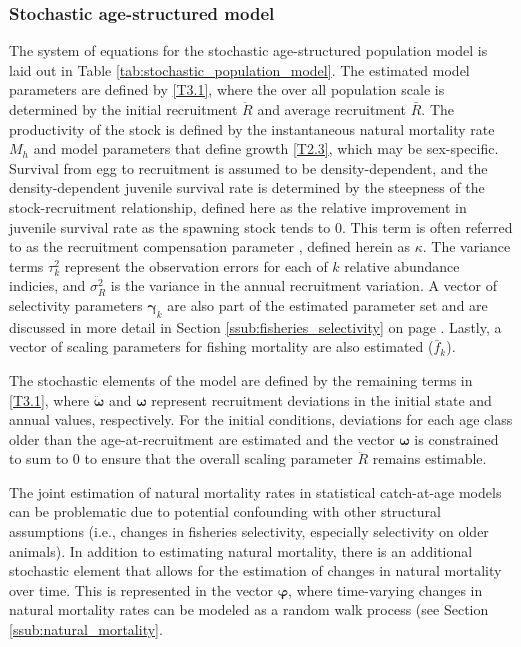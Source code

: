 \subsubsection{Stochastic age-structured model} %
\label{ssub:stochastic_age_structured_model}
    The system of equations for the stochastic age-structured population model is laid out in Table \ref{tab:stochastic_population_model}.  The estimated model parameters are defined by \eqref{T3.1}, where the over all population scale is determined by the initial recruitment $\ddot{R}$ and average recruitment $\bar{R}$.  The productivity of the stock is defined by the instantaneous natural mortality rate $M_h$ and model parameters that define growth \eqref{T2.3}, which may be sex-specific.  Survival from egg to recruitment is assumed to be density-dependent, and the density-dependent juvenile survival rate is determined by the steepness of the stock-recruitment relationship, defined here as the relative improvement in juvenile survival rate as the spawning stock tends to 0. This term is often referred to as the recruitment compensation parameter \citep{goodyear1993spawning}, defined herein as $\kappa$. The variance terms $\tau^2_k$  represent the observation errors for each of $k$ relative abundance indicies, and $\sigma_R^2$ is the variance in the annual recruitment variation.  A vector of selectivity parameters $\bm{\gamma}_k$ are also part of the estimated parameter set and are discussed in more detail in Section \ref{ssub:fisheries_selectivity} on page \pageref{ssub:fisheries_selectivity}.  Lastly, a vector of scaling parameters for fishing mortality are also estimated ($\bar{f}_k$).

    The stochastic elements of the model are defined by the remaining terms in \eqref{T3.1}, where $\ddot{\bm{\omega}}$ and $\bm{\omega}$ represent recruitment deviations in the initial state and annual values, respectively.  For the initial conditions, deviations for each age class older than the age-at-recruitment are estimated and the vector $\bm{\omega}$ is constrained to sum to 0 to ensure that the overall scaling parameter $\ddot{R}$ remains estimable.

    The joint estimation of natural mortality rates in statistical catch-at-age models can be problematic due to potential confounding with other structural assumptions (i.e., changes in fisheries selectivity, especially selectivity on older animals).  In addition to estimating natural mortality, there is an additional stochastic element that allows for the estimation of changes in natural mortality over time.  This is represented in the vector $\bm{\varphi}$, where time-varying changes in natural mortality rates can be modeled as a random walk process (see Section \ref{ssub:natural_mortality}.



